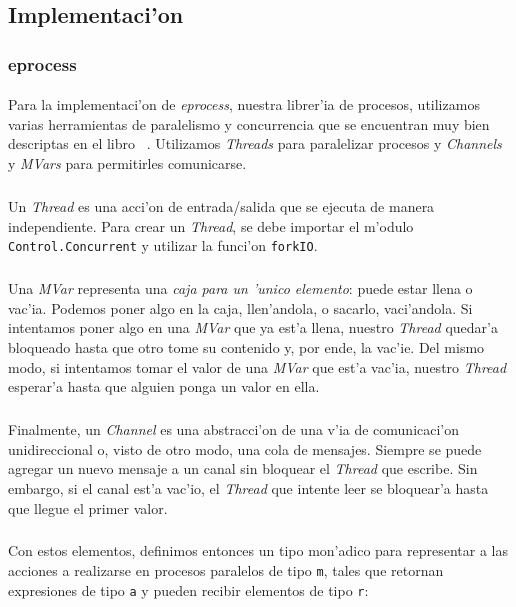 \documentclass[a4paper]{article}
\begin{document}
\newpage
\subsection{Implementaci'on}\label{secImplement}
\begin{epigraphs}
\end{epigraphs}

\subsubsection{eprocess}\label{secEprocess}
\paragraph{}Para la implementaci'on de \textsl{eprocess}, nuestra librer'ia de procesos, utilizamos varias herramientas de paralelismo y concurrencia que se encuentran muy bien descriptas en el libro ~\cite{realworldhaskell}.  Utilizamos \textsl{Threads} para paralelizar procesos y \textsl{Channels} y \textsl{MVars} para permitirles comunicarse.
\subparagraph{}Un \textsl{Thread} es una acci'on de entrada/salida que se ejecuta de manera independiente.  Para crear un \textsl{Thread}, se debe importar el m'odulo \texttt{Control.Concurrent} y utilizar la funci'on \texttt{forkIO}.
\subparagraph{}Una \textsl{MVar} representa una \textit{caja para un 'unico elemento}: puede estar llena o vac'ia.  Podemos poner algo en la caja, llen'andola, o sacarlo, vaci'andola.  Si intentamos poner algo en una \textsl{MVar} que ya est'a llena, nuestro \textsl{Thread} quedar'a bloqueado hasta que otro tome su contenido y, por ende, la vac'ie.  Del mismo modo, si intentamos tomar el valor de una \textsl{MVar} que est'a vac'ia, nuestro \textsl{Thread} esperar'a hasta que alguien ponga un valor en ella.
\subparagraph{}Finalmente, un \textsl{Channel} es una abstracci'on de una v'ia de comunicaci'on unidireccional o, visto de otro modo, una cola de mensajes.  Siempre se puede agregar un nuevo mensaje a un canal sin bloquear el \textsl{Thread} que escribe.  Sin embargo, si el canal est'a vac'io, el \textsl{Thread} que intente leer se bloquear'a hasta que llegue el primer valor.
\subparagraph{}Con estos elementos, definimos entonces un tipo mon'adico para representar a las acciones a realizarse en procesos paralelos de tipo \texttt{m}, tales que retornan expresiones de tipo \texttt{a} y pueden recibir elementos de tipo \texttt{r}:
\end{document}
